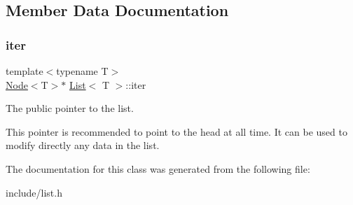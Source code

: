 \subsection{Member Data Documentation}
\mbox{\label{class_list_a36398f758397060735c8df9f7d11235d}} 
\subsubsection{\texorpdfstring{iter}{iter}}
{\footnotesize\ttfamily template$<$typename T$>$ \\
\hyperlink{struct_node}{Node}$<$T$>$$\ast$ \hyperlink{class_list}{List}$<$ T $>$\+::iter}



The public pointer to the list. 

This pointer is recommended to point to the head at all time. It can be used to modify directly any data in the list. 

The documentation for this class was generated from the following file\+:\begin{DoxyCompactItemize}
\item 
include/list.\+h\end{DoxyCompactItemize}
